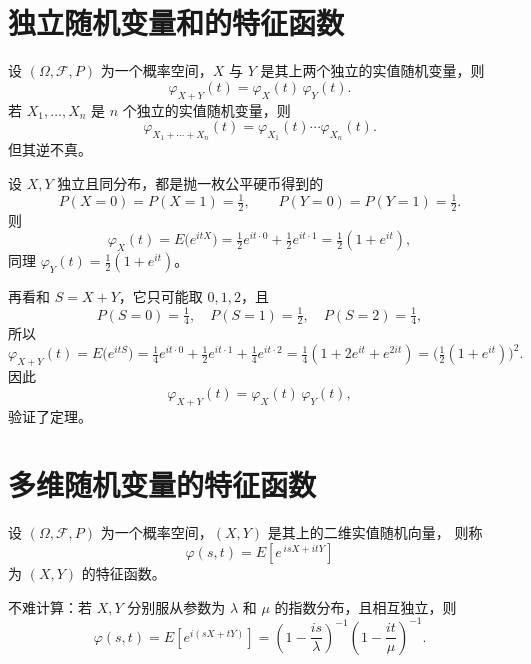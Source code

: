 \newpage
\section{独立随机变量和的特征函数}

\begin{theorem}[ 独立实值随机变量的和的特征函数等于各随机变量特征函数的乘积。]
设 $(\Omega,\mathcal F,P)$ 为一个概率空间，$X$ 与 $Y$ 是其上两个独立的实值随机变量，则
\[
\varphi_{X+Y}(t)=\varphi_X(t)\,\varphi_Y(t).
\]
若 $X_1,\ldots,X_n$ 是 $n$ 个独立的实值随机变量，则
\[
\varphi_{X_1+\cdots+X_n}(t)=\varphi_{X_1}(t)\cdots\varphi_{X_n}(t).
\]
但其逆不真。
\end{theorem}
\begin{example}
设 $X,Y$ 独立且同分布，都是抛一枚公平硬币得到的
\[
P(X=0)=P(X=1)=\tfrac12,\qquad P(Y=0)=P(Y=1)=\tfrac12.
\]
则
\[
\varphi_X(t)=E\big(e^{itX}\big)
           =\tfrac12 e^{it\cdot0}+\tfrac12 e^{it\cdot1}
           =\tfrac12(1+e^{it}),
\]
同理 $\varphi_Y(t)=\tfrac12(1+e^{it})$。

再看和 $S=X+Y$，它只可能取 $0,1,2$，且
\[
P(S=0)=\tfrac14,\quad P(S=1)=\tfrac12,\quad P(S=2)=\tfrac14,
\]
所以
\[
\varphi_{X+Y}(t)
=E\big(e^{itS}\big)
=\tfrac14 e^{it\cdot0}+\tfrac12 e^{it\cdot1}+\tfrac14 e^{it\cdot2}
=\tfrac14(1+2e^{it}+e^{2it})
=\Big(\tfrac12(1+e^{it})\Big)^2.
\]
因此
\[
\varphi_{X+Y}(t)=\varphi_X(t)\,\varphi_Y(t),
\]
验证了定理。
\end{example}
\section{多维随机变量的特征函数}
\begin{definition}[二维随机向量的特征函数]
设 $(\Omega,\mathcal F,P)$ 为一个概率空间，$(X,Y)$ 是其上的二维实值随机向量，
则称
\[
\varphi(s,t)=E\!\left[e^{\,i sX + i tY}\right]
\]
为 $(X,Y)$ 的特征函数。
\end{definition}
不难计算：若 $X,Y$ 分别服从参数为 $\lambda$ 和 $\mu$ 的指数分布，且相互独立，则
\[
\varphi(s,t)
=E\!\left[e^{i(sX+tY)}\right]
=\left(1-\frac{i s}{\lambda}\right)^{-1}
  \left(1-\frac{i t}{\mu}\right)^{-1}.
\]

